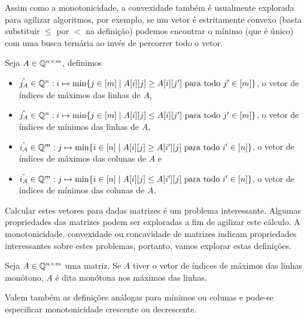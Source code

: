 Assim como a monotonicidade, a convexidade também é usualmente explorada para agilizar algoritmos, por exemplo, se um vetor é estritamente convexo (basta substituir $\leq$ por $<$ na definição) podemos encontrar o mínimo (que é único) com uma busca ternária ao invés de percorrer todo o vetor.  

\begin{defi}
Seja $A \in \mathbb{Q}^{n \times m}$, definimos
    \begin{itemize}
        \item $\hat{j_A} \in \mathbb{Q}^n : i \mapsto \min\{j \in [m] \mid A[i][j] \geq A[i][j'] \text{ para todo } j' \in [m]\}$, o vetor de índices de máximos das linhas de $A$,
        \item $\check{j_A} \in \mathbb{Q}^n : i \mapsto \min\{j \in [m] \mid A[i][j] \leq A[i][j'] \text{ para todo } j' \in [m]\}$, o vetor de índices de mínimos das linhas de $A$,
        \item $\hat{i_A} \in \mathbb{Q}^m : j \mapsto \min\{i \in [n] \mid A[i][j] \geq A[i'][j] \text{ para todo } i' \in [n]\}$, o vetor de índices de máximos das colunas de $A$ e 
        \item $\check{i_A} \in \mathbb{Q}^m : j \mapsto \min\{i \in [n] \mid A[i][j] \leq A[i'][j] \text{ para todo } i' \in [n]\}$, o vetor de índices de mínimos das colunas de $A$.
    \end{itemize}
\end{defi}

Calcular estes vetores para dadas matrizes é um problema interessante. Algumas propriedades das matrizes podem ser exploradas a fim de agilizar este cálculo. A monotonicidade, convexidade ou concavidade de matrizes indicam propriedades interessantes sobre estes problemas, portanto, vamos explorar estas definições.

\begin{defi}
Seja $A \in \mathbb{Q}^{n \times m}$ uma matriz. Se $A$ tiver o vetor de índices de máximos das linhas monótono, $A$ é dita monótona nos máximos das linhas. 

Valem também as definições análogas para mínimos ou colunas e pode-se especificar monotonicidade crescente ou decrescente.
\end{defi}

